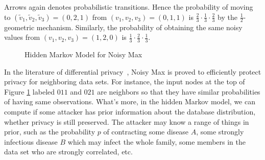 Arrows again denotes probabilistic transitions. Hence the probability
of moving to $(\tilde{v}_1, \tilde{v}_2, \tilde{v}_3) = (0, 2, 1)$
from $(v_1, v_2, v_3) = (0, 1, 1)$ is $\frac{2}{3} \cdot \frac{1}{3}
\cdot \frac{2}{3}$ by the $\frac{1}{2}$-geometric
mechanism. Similarly, the probability of obtaining the same noisy
values from $(v_1, v_2, v_3) = (1, 2, 0)$ is $\frac{1}{3} \cdot
\frac{2}{3} \cdot \frac{1}{3}$.

\begin{figure}
  \centering
  \caption{Hidden Markov Model for Noisy Max}
  \label{figure:hmm-noisy-max}
\end{figure}

In the literature of differential privacy~\cite{DR:14:AFDP,DWWZK:18:DVDP},
Noisy Max is proved to efficiently protect privacy for neighboring data sets. For instance, the input
nodes at the top of Figure \ref{figure:hmm-noisy-max} labeled $011$ and $021$ are neighbors
so that they have similar probabilities of having same observations. What's more,
in the hidden Markov model, we can compute if some attacker has prior information
about the database distribution, whether privacy is still preserved. The attacker may know
a range of things in prior, such as the probability $p$ of contracting some disease $A$,
some strongly infectious disease $B$ which may infect the whole family, some members in the
data set who are strongly correlated, etc.

